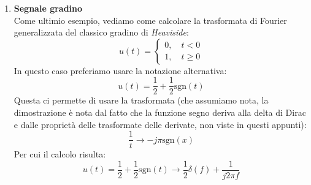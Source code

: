 \documentclass[a4paper,11pt]{article}
\begin{document}
\begin{enumerate}
Questo è esattamente in accordo con quanto avevamo visto, seppur anticipandolo in maniera approssimata, introducendo la trasformata di Fourier in 6.1.1 (notiamo che al tempo avevamo usato la DCT, che di per sé mostra questo comportamento della delta di Dirac in maniera "discretizzata").

\par\smallskip

Fissiamo i concetti notando come è possibile dimostrare il teorema della modulazione 7.6 sfruttando il teorema della moltiplicazione e l'appena trovata trasformata del segnale coseno. Avevamo detto che una modulazione non era altro che il prodotto per una cosinusoide: 
$$
z(t) = x(t) \cdot y(t) = x(t) \cos{2 \pi f_0 t}
$$
Questo ci porta ad applicare direttamente la convoluzione nel dominio frequenziale:
$$
Z(f) = X(f) \circledast \frac{\delta(f - f_0) + \delta(f + f_0)}{2}
$$
dalla trasformata del coseno appena calcolata. Ora, visto che la delta di dirac rappresenta il componente neutro della convoluzione (per la proprietà di campionamento), sarà immediato dire:
$$
Z(f) = \frac{X(f - f_0) + X(f + f_0)}{2}
$$
che è esattamente la tesi del teorema di modulazione, che risulta quindi dimostrato. \hfill $\square$

\item \textbf{\textsf{Segnale gradino}} \\
Come ultimio esempio, vediamo come calcolare la trasformata di Fourier generalizzata del classico gradino di \textit{Heaviside}:
$$
u(t) =
\begin{cases}
	0, \quad t < 0 \\
	1, \quad t \geq 0
\end{cases}
$$
In questo caso preferiamo usare la notazione alternativa:
$$
u(t) = \frac{1}{2} + \frac{1}{2} \mathrm{sgn}(t)
$$
Questa ci permette di usare la trasformata (che assumiamo nota, la dimostrazione è nota dal fatto che la funzione segno deriva alla delta di Dirac e dalle proprietà delle trasformate delle derivate, non viste in questi appunti):
$$
\frac{1}{t} \rightarrow -j \pi \mathrm{sgn}(x)
$$
Per cui il calcolo risulta:
$$
u(t) = \frac{1}{2} + \frac{1}{2} \mathrm{sgn}(t) \rightarrow \frac{1}{2} \delta(f) + \frac{1}{j 2 \pi f}
$$



\end{enumerate}
\end{document}
